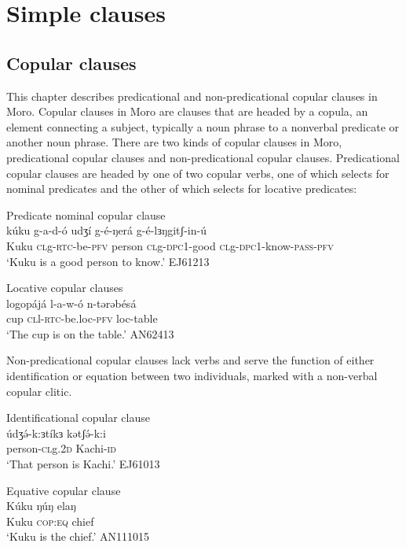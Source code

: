 \part{Simple clauses}

\chapter{Copular clauses}\label{Chapter:copular}

This chapter describes predicational and non-predicational copular clauses in Moro. Copular clauses in Moro are clauses that are headed by a copula, an element connecting a subject, typically a noun phrase to a nonverbal predicate or another noun phrase. There are two kinds of copular clauses in Moro, predicational copular clauses and non-predicational copular clauses. Predicational copular clauses are headed by one of two copular verbs, one of which selects for nominal predicates and the other of which selects for locative predicates:


\ea Predicate nominal copular clause \label{ex:ch9:1}\\
	 \gll  kúku		g-a-d-ó	     	udʒí  		g-é-ŋerá 	 	g-é-lɜŋgitʃ-in-ú\\
	 Kuku 	\textsc{cl}g-\textsc{rtc}-be-\textsc{pfv}   	person	\textsc{cl}g-\textsc{dpc}1-good	 \textsc{cl}g-\textsc{dpc}1-know-\textsc{pass}-\textsc{pfv}\\
	\glt	 ‘Kuku is a good person to know.’		\hfill 		 EJ61213 
	\z 

\ea Locative copular clauses \label{ex:ch9:2}\\
	\gll  logopájá 	 l-a-w-ó   				n-tərəbésá\\
	 		cup		 \textsc{cl}l-\textsc{rtc}-be.loc-\textsc{pfv}			loc-table\\
	\glt ‘The cup is on the table.’	 \hfill 			AN62413 \z


 Non-predicational copular clauses lack verbs and serve the function of either identification or equation between two individuals, marked with a non-verbal copular clitic.
 
\ea  	Identificational copular clause \label{ex:ch9:3}\\
	\gll údʒə́-k:ɜtíkɜ 	kətʃə́-k:i \\ 
		person-\textsc{cl}g.\textsc{2d} 	Kachi-\textsc{id} \\
	\glt ‘That person is Kachi.’		\hfill 	EJ61013  \z 

\ea  	Equative copular clause \label{ex:ch9:4}\\
	\gll 	Kúku ŋúŋ elaŋ\\
				Kuku \textsc{cop:eq} chief\\
		\glt	`Kuku is the chief.' \hfill AN111015 \z 
	
